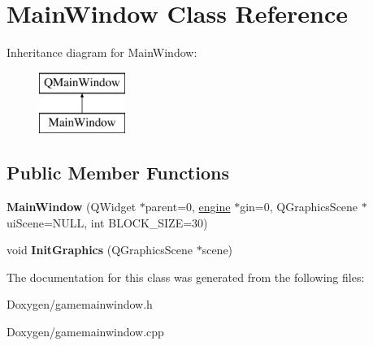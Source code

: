 \hypertarget{class_main_window}{\section{Main\-Window Class Reference}
\label{class_main_window}
}
Inheritance diagram for Main\-Window\-:\begin{figure}[H]
\begin{center}
\leavevmode
\includegraphics[height=2.000000cm]{class_main_window}
\end{center}
\end{figure}
\subsection*{Public Member Functions}
\begin{DoxyCompactItemize}
\item 
\hypertarget{class_main_window_a100ead45842e8680c9cbfa334a0e30b4}{{\bfseries Main\-Window} (Q\-Widget $\ast$parent=0, \hyperlink{classengine}{engine} $\ast$gin=0, Q\-Graphics\-Scene $\ast$ui\-Scene=N\-U\-L\-L, int B\-L\-O\-C\-K\-\_\-\-S\-I\-Z\-E=30)}\label{class_main_window_a100ead45842e8680c9cbfa334a0e30b4}

\item 
\hypertarget{class_main_window_abbbcd7e315b91ac8ead9d87fa61c9f3c}{void {\bfseries Init\-Graphics} (Q\-Graphics\-Scene $\ast$scene)}\label{class_main_window_abbbcd7e315b91ac8ead9d87fa61c9f3c}

\end{DoxyCompactItemize}


The documentation for this class was generated from the following files\-:\begin{DoxyCompactItemize}
\item 
Doxygen/gamemainwindow.\-h\item 
Doxygen/gamemainwindow.\-cpp\end{DoxyCompactItemize}
